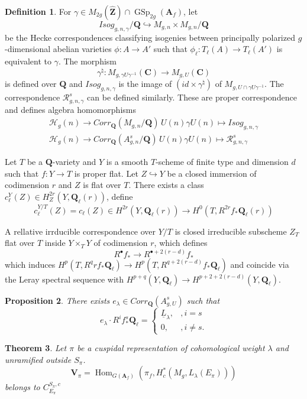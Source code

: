 \documentclass[leqno]{amsart}
\DeclareMathOperator{\GSp}{GSp}
\newcommand{\Q}{{\mathbf{Q}}}
\newcommand{\Ql}{\mathbf{Q}_\ell}
\newcommand{\C}{\mathbf C}
\newcommand{\A}{\mathbf A}
\newcommand{\hZ}{{\hat{\mathbf{Z}}}}
\newcommand{\1}{\mathbf{1}}
\DeclareMathOperator{\Hom}{Hom}
\newtheorem{thm}{Theorem}[section]
\newtheorem{prop}[thm]{Proposition}
\theoremstyle{definition}
\newtheorem{defn}[thm]{Definition}
\theoremstyle{remark}
\begin{document}
\begin{defn}
	For $\gamma\in M_{2g}(\hZ)\cap \GSp_{2g}(\A_f)$,
	let 
	\[
		Isog_{g,n,\gamma}/\Q\hookrightarrow
		M_{g,n}\times M_{g,n}/\Q
	\]
	be the Hecke correspondences classifying
	isogenies between principally polarized
	$g$-dimensional abelian varieties
	$\phi\colon A\to A'$ such that 
	 $\phi_\ell\colon T_\ell(A)\to T_\ell(A')$
	 is equivalent to  $\gamma$.
	 The morphism
	  \[
	 	\gamma^\natural\colon 
		M_{g,\gamma U\gamma^{-1}}(\C)\to
		M_{g,U}(\C)
	 \]
	 is defined over $\Q$
	 and  $Isog_{g,n,\gamma}$ is the image of 
	 $(id\times \gamma^\natural)$
	 of  $M_{g,U\cap\gamma U\gamma^{-1}}$.
	 The correspondence $\mathcal{R}^s_{g,n,\gamma}$
	 can be defined similarly.
	 These are proper correspondence and defines 
	 algebra homomorphisms
	 \begin{align*}
		 \mathcal{H}_g(n)\to Corr_\Q(M_{g,n}/\Q)\,
		 U(n)\gamma U(n)\mapsto Isog_{g,n,\gamma}\\
		 \mathcal{H}_g(n)\to Corr_\Q(A^s_{g,n}/\Q)\,
		 U(n)\gamma U(n)\mapsto \mathcal{R}^s_{g,n,\gamma}
	 \end{align*}
\end{defn}

Let $T$ be a  $\Q$-variety 
and $Y$ is a smooth  $T$-scheme of finite type
and dimension  $d$
such that  $f\colon Y\to T$ is proper flat.
Let  $Z\hookrightarrow Y$ be a closed immersion
of codimension $r$ and  $Z$ is flat over  $T$.
There exists a class $c^Y_\ell(Z)\in H^{2r}_Z(Y,\Ql(r))$,
define 
\[
	c^{Y/T}_\ell(Z)=
	c_\ell(Z)\in 
	H^{2r}(Y,\Ql(r))\to H^0(T,R^{2r}f_*\Ql(r))
\]

A rellative irrducible correspondence over $Y/T$
is closed irreducible subscheme  $Z_T$
flat over  $T$ inside  $Y\times_TY$ of codimension  $r$,
which defines 
 \[
	R^\bullet f_*\to R^{\bullet+2(r-d)}f_*
\]
which induces 
$H^p(T, R^qrf_*\Ql)\to H^p(T, R^{q+2(r-d)}f_*\Ql)$ 
and coincide 
via the Leray spectral sequence with
$H^{p+q}(Y,\Ql)\to H^{p+2+2(r-d)}(Y,\Ql)$.

\begin{prop}
	There exists $e_\lambda\in Corr_\Q(A_{g,U}^s)$
	such that
	\[
		e_\lambda\cdot R^if^s_*\Ql=
		\begin{cases}
			\underline{L}_\lambda, &, i=s\\
			0, &, i\neq s.
		\end{cases}
	\]
\end{prop}

\begin{thm}
	Let $\pi$ be a cuspidal representation
	of cohomological weight  $\lambda$
	and  unramified outside $S_\pi$.
	 \[
		 \mathbf{V}_\pi=\Hom_{G(\A_f)}
		 (\pi_f,H^*_c(M_g, L_\lambda(E_\pi)))
	\]
	belongs to $C_{E_\pi}^{S_\pi, c}$
\end{thm}
\end{document}
